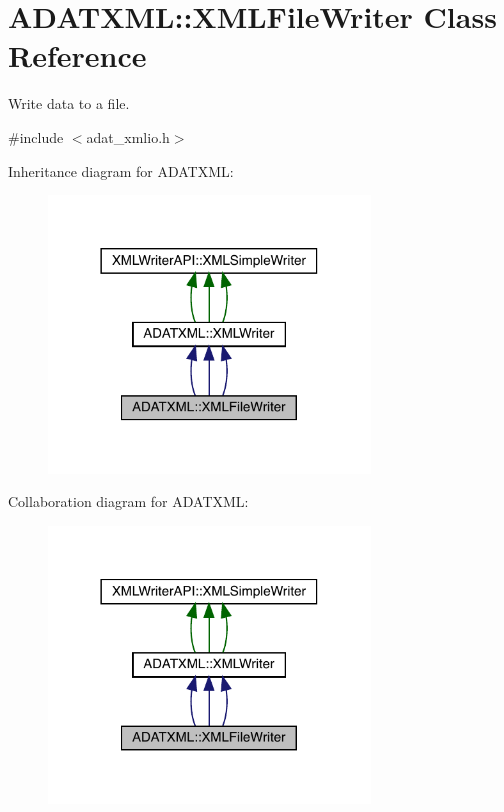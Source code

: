 \hypertarget{classADATXML_1_1XMLFileWriter}{}\section{A\+D\+A\+T\+X\+ML\+:\+:X\+M\+L\+File\+Writer Class Reference}
\label{classADATXML_1_1XMLFileWriter}


Write data to a file.  




{\ttfamily \#include $<$adat\+\_\+xmlio.\+h$>$}



Inheritance diagram for A\+D\+A\+T\+X\+ML\+:
\nopagebreak
\begin{figure}[H]
\begin{center}
\leavevmode
\includegraphics[width=242pt]{d6/da7/classADATXML_1_1XMLFileWriter__inherit__graph}
\end{center}
\end{figure}


Collaboration diagram for A\+D\+A\+T\+X\+ML\+:
\nopagebreak
\begin{figure}[H]
\begin{center}
\leavevmode
\includegraphics[width=242pt]{d8/dd7/classADATXML_1_1XMLFileWriter__coll__graph}
\end{center}
\end{figure}
